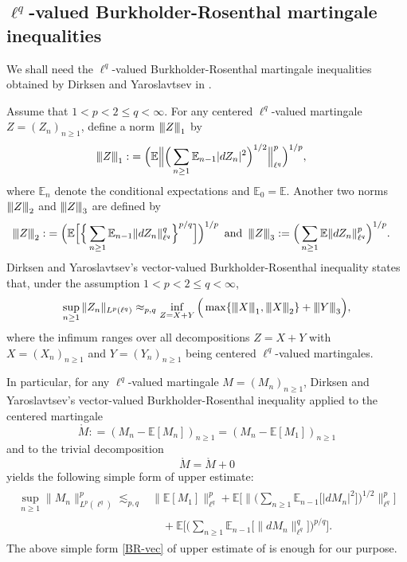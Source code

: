\documentclass[12pt]{amsart}
\newcommand{\normmm}[1]{{\left\vert\kern-0.25ex\left\vert\kern-0.25ex\left\vert #1 
    \right\vert\kern-0.25ex\right\vert\kern-0.25ex\right\vert}}
\theoremstyle{definition}
\theoremstyle{remark}
\newcommand{\E}{\mathbb{E}}
\newcommand{\an}{\text{\, and \,}}
\numberwithin{equation}{section}
\begin{document}
\subsection{$\ell^q$-valued Burkholder-Rosenthal martingale inequalities} 

We shall need the $\ell^q$-valued Burkholder-Rosenthal martingale  inequalities obtained by Dirksen and Yaroslavtsev in \cite{PLMS-2019}.  




Assume that $1<p<2\le q<\infty$.    For any  centered $\ell^q$-valued martingale $Z = (Z_n)_{n\ge 1}$,   define a norm  $\normmm{Z}_1$ by 
\begin{align*}
\normmm{Z}_1  :& = \Big(\E\Big\|   \Big(\sum_{n\ge 1}\mathbb{E}_{n-1} |dZ_n|^2 \Big)^{1/2}\Big\|_{\ell^q}^p \Big)^{1/p},
\end{align*}
where $\E_n$ denote the conditional expectations and $\E_0 = \E$.   Another two norms  $\normmm{Z}_2$ and $\normmm{Z}_3$ are defined by 
\begin{align*}
\normmm{Z}_2   : & =\Big(\mathbb{E}\Big[ \Big\{ \sum_{n\ge 1} \mathbb{E}_{n-1}  \|dZ_n \|_{\ell^q}^q \Big\}^{p/q}\Big]\Big)^{1/p} \an 
 \normmm{Z}_3  : =\Big(\sum_{n\ge 1} \mathbb{E} \|dZ_n \|_{\ell^q}^p\Big)^{1/p}. 
\end{align*}
Dirksen and Yaroslavtsev's vector-valued Burkholder-Rosenthal inequality    \cite[Theorem 1]{PLMS-2019} states that, under the assumption  $1<p<2\le q<\infty$, 
\[
\sup_{n\ge 1} \|Z_n\|_{L^p(\ell^q)} \approx_{p,q}   \inf_{Z = X+Y}  \Big( \max\{   \normmm{X}_1, \normmm{X}_2 \}   +  \normmm{Y}_3  \Big),
\] 
where the infimum ranges over all decompositions $Z = X+Y$ with $X = (X_n)_{n\ge 1}$ and $Y = (Y_n)_{n\ge 1}$ being centered $\ell^q$-valued martingales. 






In particular,  for any $\ell^q$-valued martingale $M = (M_n)_{n\ge 1}$,   Dirksen and Yaroslavtsev's vector-valued Burkholder-Rosenthal inequality    \cite[Theorem 1]{PLMS-2019} applied  to the centered martingale 
\[
\mathring{M} : = (M_n-\E[M_n])_{n\ge 1} = (M_n-\E[M_1])_{n\ge 1}
\]
 and to the trivial decomposition 
 \[
 \mathring{M}= \mathring{M} +0
 \]
  yields the following   simple  form  of  upper estimate:
\begin{align}\label{BR-vec}
\begin{split}
\sup_{n\ge 1} \|M_n\|_{L^p(\ell^q)}^p \lesssim_{p,q} &    \|\E[M_1]\|_{\ell^q}^p +    \E\Big[ \Big\|\Big(\sum_{n\ge 1}\mathbb{E}_{n-1}\big[|dM_n|^2\big]\Big)^{1/2}\Big\|_{\ell^q}^p \Big] 
\\
& \quad +   \E\Big[\Big(\sum_{n\ge1}\E_{n-1}\big[\|dM_n\|_{\ell^q}^q\big]\Big)^{p/q}\Big].
\end{split}
\end{align}
The above simple  form  \eqref{BR-vec} of  upper estimate of \cite[Theorem 1]{PLMS-2019}   is enough for our purpose. 
\end{document}
